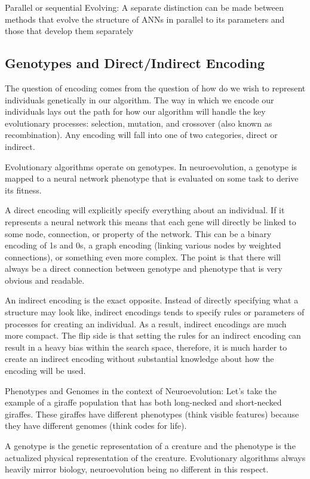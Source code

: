 \documentclass[journal, a4paper]{IEEEtran}
\begin{document}
Parallel or sequential Evolving:
A separate distinction can be made between methods that evolve the structure of ANNs in parallel to its parameters and those that develop them separately


\subsection{Genotypes and Direct/Indirect Encoding}
The question of encoding comes from the question of how do we wish to represent individuals genetically in our algorithm. The way in which we encode our individuals lays out the path for how our algorithm will handle the key evolutionary processes: selection, mutation, and crossover (also known as recombination). Any encoding will fall into one of two categories, direct or indirect.

Evolutionary algorithms operate on genotypes. In neuroevolution, a genotype is mapped to a neural network phenotype that is evaluated on some task to derive its fitness.

A direct encoding will explicitly specify everything about an individual. If it represents a neural network this means that each gene will directly be linked to some node, connection, or property of the network. This can be a binary encoding of 1s and 0s, a graph encoding (linking various nodes by weighted connections), or something even more complex. The point is that there will always be a direct connection between genotype and phenotype that is very obvious and readable. \cite{cite02}

An indirect encoding is the exact opposite. Instead of directly specifying what a structure may look like, indirect encodings tends to specify rules or parameters of processes for creating an individual. As a result, indirect encodings are much more compact. The flip side is that setting the rules for an indirect encoding can result in a heavy bias within the search space, therefore, it is much harder to create an indirect encoding without substantial knowledge about how the encoding will be used. \cite{cite02}

Phenotypes and Genomes in the context of Neuroevolution:
Let's take the example of a giraffe population that has both long-necked and short-necked giraffes. These giraffes have different phenotypes (think visible features) because they have different genomes (think codes for life).

A genotype is the genetic representation of a creature and the phenotype is the actualized physical representation of the creature. Evolutionary algorithms always heavily mirror biology, neuroevolution being no different in this respect.
\end{document}
